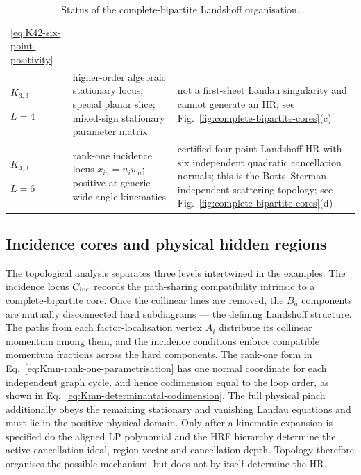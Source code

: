 \documentclass[a4paper,11pt]{article}
\begin{document}
\begin{table}[H]
\begin{tabular}{@{}
 >{\centering\arraybackslash}p{}
 >{\raggedright\arraybackslash}p{}
 >{\raggedright\arraybackslash}p{}@{}}
  \eqref{eq:K42-six-point-positivity}\\\addlinespace[3pt]
\(K_{3,3}\)\par{\scriptsize \(L=4\)}
& higher-order algebraic stationary locus; special planar slice; mixed-sign
  stationary parameter matrix
& not a first-sheet Landau singularity and cannot generate an HR; see
  Fig.~\ref{fig:complete-bipartite-cores}(c)\\\addlinespace[3pt]
\(K_{4,3}\)\par{\scriptsize \(L=6\)}
& rank-one incidence locus \(x_{ia}=u_i w_a\); positive at generic
  wide-angle kinematics
& certified four-point Landshoff HR with six independent quadratic
  cancellation normals; this is the Botts--Sterman independent-scattering
  topology; see
  Fig.~\ref{fig:complete-bipartite-cores}(d)\\
\bottomrule
\end{tabular}
\caption{Status of the complete-bipartite Landshoff organisation.}
\label{tab:complete-bipartite-landshoff-status}
\end{table}

\subsection{Incidence cores and physical hidden regions}
\label{sec:incidence-cores-physical-HRs}

The topological analysis separates three levels intertwined in the examples.
The incidence locus \(C_{\rm inc}\) records the
path-sharing compatibility intrinsic to a complete-bipartite core.  Once the
collinear lines are removed, the \(B_a\) components are mutually disconnected
hard subdiagrams --- the defining Landshoff structure.  The paths from each
factor-localisation vertex \(A_i\) distribute its collinear momentum among
them, and the incidence conditions enforce compatible momentum fractions
across the hard components.  The
rank-one form in Eq.~\eqref{eq:Kmn-rank-one-parametrisation} has one normal
coordinate for each independent graph cycle, and hence codimension equal to
the loop order, as shown in Eq.~\eqref{eq:Kmn-determinantal-codimension}.
The full physical pinch additionally obeys the remaining stationary and
vanishing Landau equations and must lie in the positive physical domain.
Only after a kinematic expansion is specified do the aligned LP polynomial
and the HRF hierarchy determine the active cancellation ideal, region vector
and cancellation depth.  Topology therefore organises the possible
mechanism, but does not by itself determine the HR.
\end{document}
